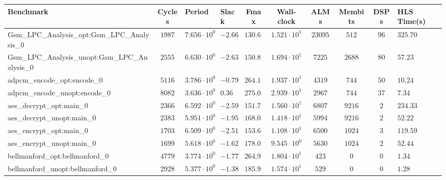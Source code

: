 \begin{tabular}{|l|c|HHc|c|c|c|cH|}
\hline
Benchmark                                       & Cycles       & Period                 & Slack     & Fmax       & Wall-clock              & ALMs       & Membits     & DSPs    & HLS Time(s) \\
\hline
Gsm\_LPC\_Analysis\_opt:Gsm\_LPC\_Analysis\_0   & $ 1987     $ & $ 7.656 \cdot 10^{0} $ & $ -2.66 $ & $ 130.62 $ & $ 1.521 \cdot 10^{1}  $ & $ 23095  $ & $ 512     $ & $ 96  $ & $ 325.70  $ \\
Gsm\_LPC\_Analysis\_unopt:Gsm\_LPC\_Analysis\_0 & $ 2555     $ & $ 6.630 \cdot 10^{0} $ & $ -2.63 $ & $ 150.83 $ & $ 1.694 \cdot 10^{1}  $ & $ 7225   $ & $ 2688    $ & $ 80  $ & $ 57.23   $ \\
adpcm\_encode\_opt:encode\_0                    & $ 5116     $ & $ 3.786 \cdot 10^{0} $ & $ -0.79 $ & $ 264.13 $ & $ 1.937 \cdot 10^{1}  $ & $ 4319   $ & $ 744     $ & $ 50  $ & $ 10.24   $ \\
adpcm\_encode\_unopt:encode\_0                  & $ 8082     $ & $ 3.636 \cdot 10^{0} $ & $ 0.36  $ & $ 275.03 $ & $ 2.939 \cdot 10^{1}  $ & $ 2967   $ & $ 744     $ & $ 37  $ & $ 7.34    $ \\
aes\_decrypt\_opt:main\_0                       & $ 2366     $ & $ 6.592 \cdot 10^{0} $ & $ -2.59 $ & $ 151.70 $ & $ 1.560 \cdot 10^{1}  $ & $ 6807   $ & $ 9216    $ & $ 2   $ & $ 234.33  $ \\
aes\_decrypt\_unopt:main\_0                     & $ 2383     $ & $ 5.951 \cdot 10^{0} $ & $ -1.95 $ & $ 168.04 $ & $ 1.418 \cdot 10^{1}  $ & $ 5994   $ & $ 9216    $ & $ 2   $ & $ 52.22   $ \\
aes\_encrypt\_opt:main\_0                       & $ 1703     $ & $ 6.509 \cdot 10^{0} $ & $ -2.51 $ & $ 153.63 $ & $ 1.108 \cdot 10^{1}  $ & $ 6500   $ & $ 1024    $ & $ 3   $ & $ 119.59  $ \\
aes\_encrypt\_unopt:main\_0                     & $ 1699     $ & $ 5.618 \cdot 10^{0} $ & $ -1.62 $ & $ 178.00 $ & $ 9.545 \cdot 10^{0}  $ & $ 5630   $ & $ 1024    $ & $ 2   $ & $ 52.44   $ \\
bellmanford\_opt:bellmanford\_0                 & $ 4779     $ & $ 3.774 \cdot 10^{0} $ & $ -1.77 $ & $ 264.97 $ & $ 1.804 \cdot 10^{1}  $ & $ 423    $ & $ 0       $ & $ 0   $ & $ 1.34    $ \\
bellmanford\_unopt:bellmanford\_0               & $ 2928     $ & $ 5.377 \cdot 10^{0} $ & $ -1.38 $ & $ 185.98 $ & $ 1.574 \cdot 10^{1}  $ & $ 529    $ & $ 0       $ & $ 0   $ & $ 1.28    $ \\

\end{tabular}
